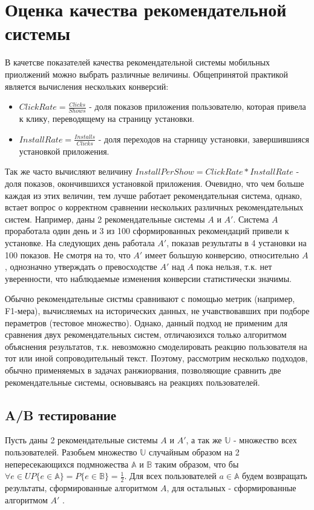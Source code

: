 \documentclass[12pt,a4paper]{report}
\begin{document}
\section{Оценка качества рекомендательной системы}
В качетсве показателей качества рекомендательной системы мобильных приолжений можно выбрать различные величины. Общепринятой практикой является вычисления нескольких конверсий:
\begin{itemize}
\item $ClickRate = \frac{Clicks}{Shows}$ - доля показов приложения пользователю, которая привела к клику, переводящему на страницу установки.
\item $InstallRate = \frac{Installs}{Clicks}$ - доля переходов на старницу установки, завершившияся установкой приложения.
\end{itemize}
Так же часто вычисляют величину $InstallPerShow = ClickRate * InstallRate$ - доля показов, окончившихся установкой приложения.
Очевидно, что чем больше каждая из этих величин, тем лучше работает рекомендательная система, однако, встает вопрос о корректном сравнении нескольких различных рекомендательных систем.
Например, даны 2 рекомендательные системы $A$ и $A'$. Система $A$ проработала один день и 3 из 100 сформированных рекомендаций привели к установке. На следующих день работала $A'$, показав результаты в 4 установки на 100 показов. Не смотря на то, что $A'$ имеет большую конверсию, относительно $A$, однозначно утверждать о превосходстве $A'$ над $A$ пока нельзя, т.к. нет уверенности, что наблюдаемые изменения конверсии статистически значимы.

Обычно рекомендательные систмы сравнивают с помощью метрик (например, F1-мера), вычисляемых на исторических данных, не учавствовавших при подборе пераметров (тестовое множество). Однако, данный подход не применим для сравнения двух рекомендательных систем, отличаюзихся только алгоритмом объяснения результатов, т.к. невозможно смоделировать реакцию пользователя на тот или иной сопроводительный текст. Поэтому, рассмотрим несколько подходов, обычно применяемых в задачах ранжиорвания, позволяющие сравнить две рекомендательные системы, основываясь на реакциях пользователей.

\subsection{A/B тестирование}
Пусть даны 2 рекомендательные системы $A$ и $A'$, а так же $\mathbb{U}$ - множество всех пользователей. Разобьем множество $\mathbb{U}$ случайным образом на 2 непересекающихся подмножества $\mathbb{A}$ и  $\mathbb{B}$ таким образом, что бы $\forall e \in U \textit{P}\{e \in \mathbb{A}\} = \textit{P}\{e \in \mathbb{B}\} = \frac{1}{2}$.
Для всех пользователей $a \in \mathbb{A}$ будем возвращать результаты, сформированные алгоритмом $A$, для остальных - сформированные алгоритмом $A'$ \cite{Ab}.
\end{document}
